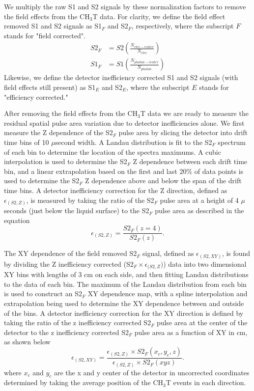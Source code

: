 We multiply the raw S1 and S2 signals by these normalization factors to remove the field effects from the CH$_3$T data.  For clarity, we define the field effect removed S1 and S2 signals as S1$_F$ and S2$_F$, respectively, where the subscript $F$ stands for "field corrected".   
\begin{align}
S2_F &=S2 \left( \frac{N_{elec-center}}{N_{elec}} \right) \\
S1_F &=S1 \left( \frac{N_{photon-center}}{N_{photon}} \right)
\end{align}
Likewise, we define the detector inefficiency corrected S1 and S2 signals (with field effects still present) as S1$_E$ and S2$_E$, where the subscript $E$ stands for "efficiency corrected."

After removing the field effects from the CH$_3$T data we are ready to measure the residual spatial pulse area variation due to detector inefficiencies alone.  We first measure the Z dependence of the S2$_F$ pulse area by slicing the detector into drift time bins of 10 $\mu$second width.  A Landau distribution is fit to the S2$_F$ spectrum of each bin to determine the location of the spectra maximums.  A cubic interpolation is used to determine the S2$_F$ Z dependence between each drift time bin, and a linear extrapolation based on the first and last 20\% of data points is used to determine the S2$_F$ Z dependence above and below the span of the drift time bins.  A detector inefficiency correction for the Z direction, defined as $\epsilon_{(S2,Z)}$, is measured by taking the ratio of the S2$_F$ pulse area at a height of 4 $\mu$seconds (just below the liquid surface) to the S2$_F$ pulse area as described in the equation
\begin{equation}
\epsilon_{(S2,Z)}= \frac{S2_F(z=4)}{S2_F(z)}.
\end{equation} 


The XY dependence of the field removed S2$_F$ signal, defined as $\epsilon_{(S2,XY)}$, is found by dividing the Z inefficiency corrected (S2$_F \times \epsilon_{(S2,Z})$) data into two dimensional XY bins with lengths of 3 cm on each side, and then fitting Landau distributions to the data of each bin.  The maximum of the Landau distribution from each bin is used to construct an S2$_F$ XY dependence map, with a spline interpolation and extrapolation being used to determine the XY dependence between and outside of the bins.  A detector inefficiency correction for the XY direction is defined by taking the ratio of the z inefficiency corrected S2$_F$ pulse area at the center of the detector to the z inefficiency corrected S2$_F$ pulse area as a function of XY in cm, as shown below
\begin{equation}
\epsilon_{(S2,XY)} = \frac{\epsilon_{(S2,Z)} \times S2_F(x_c,y_c,z)} { \epsilon_{(S2,Z)} \times S2_F(xyz)}.
\end{equation} 
where $x_c$ and $y_c$ are the x and y center of the detector in uncorrected coordinates determined by taking the average position of the CH$_3$T events in each direction.




